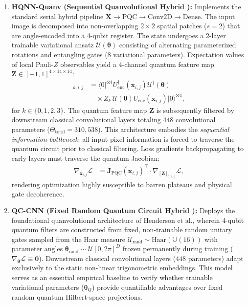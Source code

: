 \documentclass[pdflatex,sn-mathphys-num]{sn-jnl}%
\theoremstyle{thmstyleone}%
\theoremstyle{thmstyletwo}%
\theoremstyle{thmstylethree}%
\begin{document}
\begin{enumerate}
    \item \textbf{HQNN-Quanv (Sequential Quanvolutional Hybrid \cite{senokosov2024quantum}):} Implements the standard serial hybrid pipeline $\mathbf{X} \to \mathrm{PQC} \to \mathrm{Conv2D} \to \mathrm{Dense}$. The input image is decomposed into non-overlapping $2 \times 2$ spatial patches ($s=2$) that are angle-encoded into a 4-qubit register. The state undergoes a 2-layer trainable variational ansatz $\mathcal{U}(\boldsymbol{\theta})$ consisting of alternating parameterized rotations and entangling gates ($8$ variational parameters). Expectation values of local Pauli-$Z$ observables yield a 4-channel quantum feature map $\mathbf{Z} \in [-1, 1]^{4 \times 14 \times 14}$:
    \begin{align}
    [\mathbf{Z}]_{k, i, j} &= \langle 0|^{\otimes 4} U_{\mathrm{enc}}^\dagger(\mathbf{x}_{i,j}) \mathcal{U}^\dagger(\boldsymbol{\theta}) \nonumber \\
    &\quad \times Z_k \, \mathcal{U}(\boldsymbol{\theta}) U_{\mathrm{enc}}(\mathbf{x}_{i,j}) |0\rangle^{\otimes 4},
    \label{eq:hqnn_quanv_measurement}
    \end{align}
    for $k \in \{0, 1, 2, 3\}$. The quantum feature map $\mathbf{Z}$ is subsequently filtered by downstream classical convolutional layers totaling $448$ convolutional parameters ($\Theta_{\mathrm{total}} = 310{,}538$). This architecture embodies the \textit{sequential information bottleneck}: all input pixel information is forced to traverse the quantum circuit prior to classical filtering. Loss gradients backpropagating to early layers must traverse the quantum Jacobian:
    \begin{align}
    \nabla_{\mathbf{x}_{i,j}} \mathcal{L} &= \mathbf{J}_{\mathrm{PQC}}(\mathbf{x}_{i,j})^\top \cdot \nabla_{[\mathbf{Z}]_{:, i, j}} \mathcal{L},
    \label{eq:hqnn_jacobian_bottleneck}
    \end{align}
    rendering optimization highly susceptible to barren plateaus and physical gate decoherence.

    \item \textbf{QC-CNN (Fixed Random Quantum Circuit Hybrid \cite{henderson2020quanvolutional}):} Deploys the foundational quanvolutional architecture of Henderson et al., wherein 4-qubit quantum filters are constructed from fixed, non-trainable random unitary gates sampled from the Haar measure $\mathcal{U}_{\mathrm{rand}} \sim \mathrm{Haar}(\mathbb{U}(16))$ with parameter angles $\boldsymbol{\theta}_{\mathrm{rand}} \sim \mathcal{U}[0, 2\pi]^D$ frozen permanently during training ($\nabla_{\boldsymbol{\theta}} \mathcal{L} \equiv \mathbf{0}$). Downstream classical convolutional layers ($448$ parameters) adapt exclusively to the static non-linear trigonometric embeddings. This model serves as an essential empirical baseline to verify whether trainable variational parameters ($\boldsymbol{\theta}_Q$) provide quantifiable advantages over fixed random quantum Hilbert-space projections.


\end{enumerate}
\end{document}
